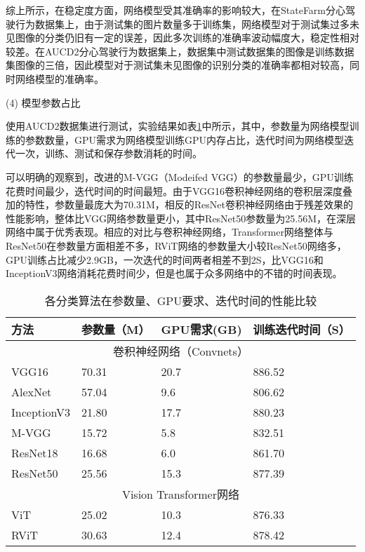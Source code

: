 综上所示，在稳定度方面，网络模型受其准确率的影响较大，在StateFarm分心驾驶行为数据集上，由于测试集的图片数量多于训练集，网络模型对于测试集过多未见图像的分类仍旧有一定的误差，因此多次训练的准确率波动幅度大，稳定性相对较差。在AUCD2分心驾驶行为数据集上，数据集中测试数据集的图像是训练数据集图像的三倍，因此模型对于测试集未见图像的识别分类的准确率都相对较高，同时网络模型的准确率。


(4)	模型参数占比

使用AUCD2数据集进行测试，实验结果如表\ref{表3.5}中所示，其中，参数量为网络模型训练的参数数量，GPU需求为网络模型训练GPU内存占比，迭代时间为网络模型迭代一次，训练、测试和保存参数消耗的时间。

可以明确的观察到，改进的M-VGG（Modeifed VGG）的参数量最少，GPU训练花费时间最少，迭代时间的时间最短。由于VGG16卷积神经网络的卷积层深度叠加的特性，参数量最庞大为70.31M，相反的ResNet卷积神经网络由于残差效果的性能影响，整体比VGG网络参数量更小，其中ResNet50参数量为25.56M，在深层网络中属于优秀表现。相应的对比与卷积神经网络，Transformer网络整体与ResNet50在参数量方面相差不多，RViT网络的参数量大小较ResNet50网络多，GPU训练占比减少2.9GB，一次迭代的时间两者相差不到2S，比VGG16和InceptionV3网络消耗花费时间少，但是也属于众多网络中的不错的时间表现。


\begin{table}[!ht]
	\caption{各分类算法在参数量、GPU要求、迭代时间的性能比较}
	\label{表3.5}
	\renewcommand{\arraystretch}{1.5}
	\centering
	\begin{tabular}{p{3cm}<{\centering}p{3cm}<{\centering}p{3cm}<{\centering}p{3cm}<{\centering}}
		\bottomrule
		方法          & 参数量（M） & GPU需求(GB) & 训练迭代时间（S） \\ \midrule
		\multicolumn{4}{c}{卷积神经网络（Convnets）}                              \\ \midrule
		VGG16       & 70.31                          & 20.7      & 886.52        \\
		AlexNet     & 57.04                          & 9.6       & 806.62        \\
		InceptionV3 & 21.80                          & 17.7      & 880.23           \\
		M-VGG       & 15.72                          & 5.8       & 832.51          \\
		ResNet18    & 16.68                          & 6.0       & 861.70          \\
		ResNet50    & 25.56                          & 15.3      & 877.39        \\ \midrule
		\multicolumn{4}{c}{Vision Transformer网络}                          \\ \midrule
		ViT         & 25.02                          & 10.3      & 876.33          \\
		RViT        & 30.63                          & 12.4      & 878.42          \\ \bottomrule
	\end{tabular}
\end{table}

